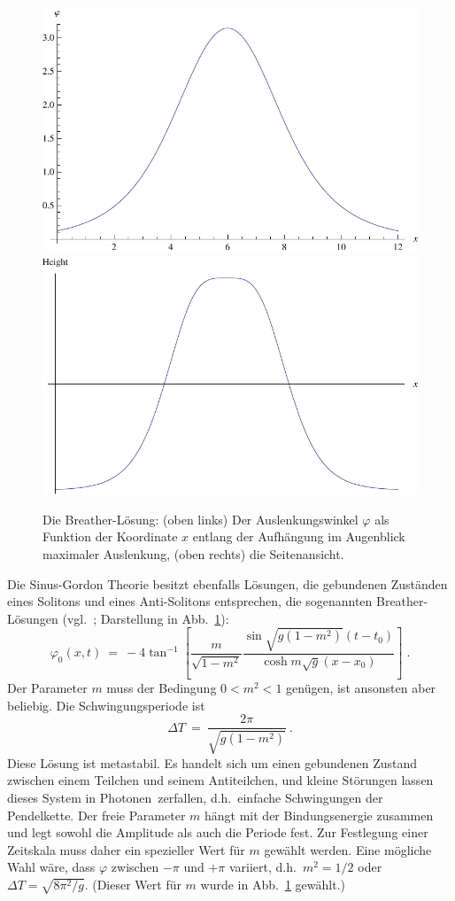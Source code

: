 \begin{figure}[htbp]
\includegraphics[width=0.47\linewidth,height=0.28\linewidth,clip]{./Bilder_SRT/Breather_phi} \hspace{0.3cm}
\includegraphics[width=0.47\linewidth,height=0.28\linewidth,clip]{./Bilder_SRT/Breather_Height}%
\caption[]{ \label{fig:Breather}
Die Breather-L\"osung: (oben links) Der Auslenkungswinkel $\varphi$ 
als Funktion der Koordinate $x$ entlang der Aufh\"angung im
Augenblick maximaler Auslenkung,
(oben rechts) die Seitenansicht.}
\end{figure}

Die Sinus-Gordon Theorie besitzt ebenfalls L\"osungen, die gebundenen
Zust\"anden eines Solitons und eines Anti-Solitons entsprechen, die 
sogenannten Breather-L\"osungen (vgl.\ \cite{Lamb}; Darstellung in
Abb.\ \ref{fig:Breather}):
\begin{equation}
\label{breather}
    \varphi_0(x,t) ~=~ - 4 \tan^{-1} \left[ \frac{m}{\sqrt{1-m^2}}
    \frac{\sin \sqrt{g(1-m^2)}(t-t_0)}{\cosh m \sqrt{g}(x-x_0)} \right]\;.
\end{equation}
Der Parameter $m$ muss der Bedingung $0<m^2<1$ gen\"ugen, ist ansonsten 
aber beliebig. Die Schwingungsperiode ist
\begin{equation}
\label{time}
     \Delta T ~=~ \frac{2\pi}{\sqrt{g(1-m^2)}}~.
\end{equation}
Diese L\"osung ist metastabil. Es handelt sich um einen gebundenen
Zustand zwi\-schen einem Teilchen und seinem Antiteilchen, und kleine
St\"orungen lassen dieses System in \glqq Photonen\grqq\ zerfallen, d.h.\
einfache Schwingungen der Pendelkette. Der freie
Parameter $m$ h\"angt mit der Bindungsenergie zusammen und legt sowohl die
Amplitude als auch die Periode fest. Zur Festlegung einer Zeitskala
muss daher ein spezieller Wert f\"ur $m$ gew\"ahlt werden. Eine m\"ogliche
Wahl w\"are, dass $\varphi$ zwischen $-\pi$ und $+\pi$ variiert, d.h.\
$m^2=1/2$ oder $\Delta T=\sqrt{8\pi^2/g}$. (Dieser Wert f\"ur $m$ wurde
in Abb.\ \ref{fig:Breather} gew\"ahlt.)
\vspace{0.3cm}

